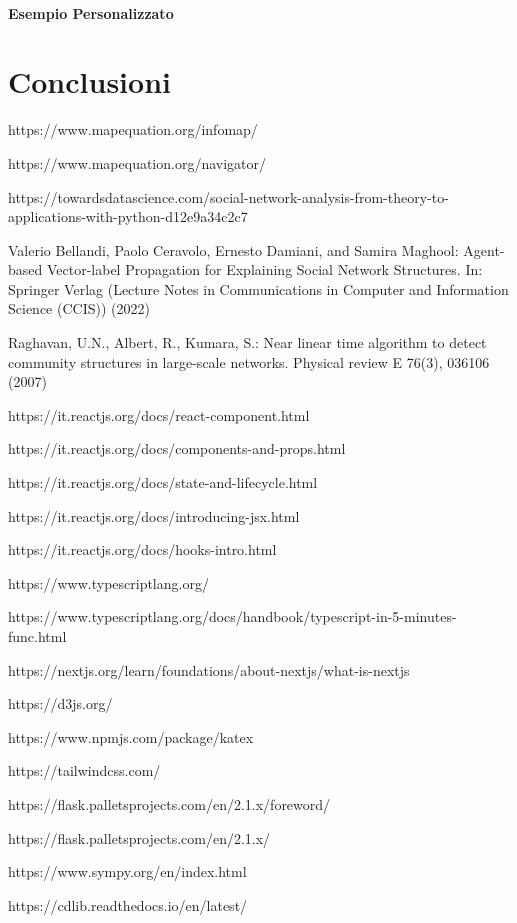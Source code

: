 \documentclass[a4paper,12pt]{report}
\begin{document}
			\subsubsection{Esempio Personalizzato}
			
\chapter{Conclusioni}

%
%
\begin{thebibliography}{0}
%
https://www.mapequation.org/infomap/

https://www.mapequation.org/navigator/

https://towardsdatascience.com/social-network-analysis-from-theory-to-applications-with-python-d12e9a34c2c7

Valerio Bellandi, Paolo Ceravolo, Ernesto Damiani, and Samira Maghool: Agent-based Vector-label Propagation for Explaining Social Network Structures. In: Springer Verlag (Lecture Notes in Communications in Computer and Information Science (CCIS)) (2022)

Raghavan, U.N., Albert, R., Kumara, S.: Near linear time algorithm to detect
community structures in large-scale networks. Physical review E 76(3), 036106
(2007)

https://it.reactjs.org/docs/react-component.html

https://it.reactjs.org/docs/components-and-props.html

https://it.reactjs.org/docs/state-and-lifecycle.html

https://it.reactjs.org/docs/introducing-jsx.html

https://it.reactjs.org/docs/hooks-intro.html

https://www.typescriptlang.org/

https://www.typescriptlang.org/docs/handbook/typescript-in-5-minutes-func.html

https://nextjs.org/learn/foundations/about-nextjs/what-is-nextjs

https://d3js.org/

https://www.npmjs.com/package/katex

https://tailwindcss.com/

https://flask.palletsprojects.com/en/2.1.x/foreword/

https://flask.palletsprojects.com/en/2.1.x/

https://www.sympy.org/en/index.html

https://cdlib.readthedocs.io/en/latest/
%
\end{thebibliography}
% 
\end{document}
